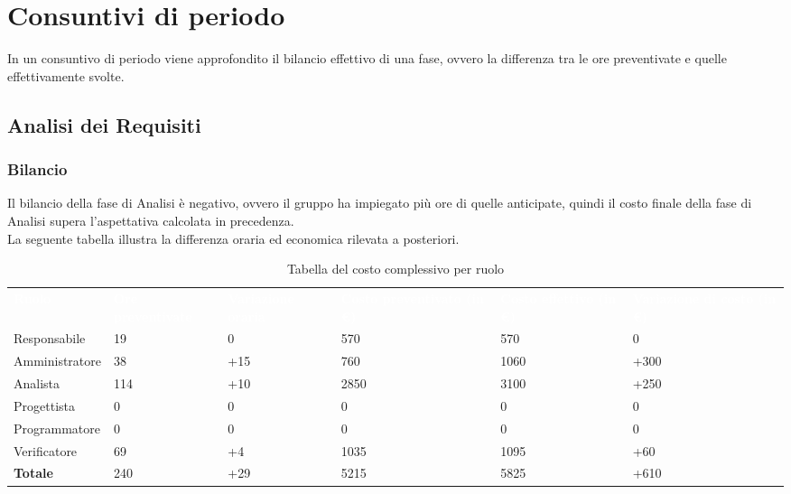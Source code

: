 \section{Consuntivi di periodo}
In un consuntivo di periodo viene approfondito il bilancio effettivo di una fase, ovvero la differenza tra le ore preventivate e quelle effettivamente svolte.

\subsection{Analisi dei Requisiti}
\subsubsection{Bilancio}
Il bilancio della fase di Analisi è negativo, ovvero il gruppo ha impiegato più ore di quelle anticipate, quindi il costo finale della fase di Analisi supera l'aspettativa calcolata in precedenza.\\
La seguente tabella illustra la differenza oraria ed economica rilevata a posteriori.

{
\renewcommand{\arraystretch}{2}
\begin{longtable}[h]{ C{2.5cm} C{2.5cm} C{2.5cm} C{2.5cm} C{1.5cm} C{2.5cm}}
\caption{Tabella del costo complessivo per ruolo}\\

\textcolor{white}{\textbf{Ruolo}} & 
\textcolor{white}{\textbf{Ore preventivate}} & 
\textcolor{white}{\textbf{Variazione oraria}} & 
\textcolor{white}{\textbf{Costo preventivato (in \euro{})}} & 
\textcolor{white}{\textbf{Costo effettivo (in \euro{})}} & 
\textcolor{white}{\textbf{Variazione di costo (in \euro{})}}\\	
	
Responsabile    &  19 &   0 &  570 &  570 &    0 \\
Amministratore  &  38 & +15 &  760 & 1060 & +300 \\
Analista        & 114 & +10 & 2850 & 3100 & +250 \\
Progettista     &   0 &   0 &    0 &    0 &    0 \\
Programmatore   &   0 &   0 &    0 &    0 &    0 \\
Verificatore    &  69 &  +4 & 1035 & 1095 &  +60 \\
\textbf{Totale} & 240 & +29 & 5215 & 5825 & +610 \\	

\end{longtable}
}

